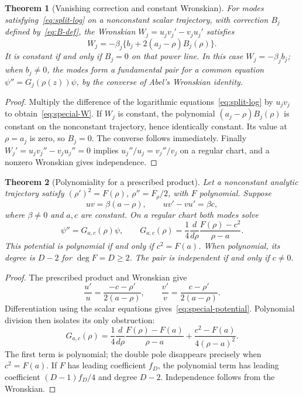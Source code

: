 \documentclass[11pt]{article}
\newtheorem{theorem}{Theorem}[section]
\begin{document}
\begin{theorem}[Vanishing correction and constant Wronskian]
\label{thm:special-W}
For modes satisfying~\eqref{eq:split-log} on a nonconstant scalar trajectory,
with correction $B_j$ defined by~\eqref{eq:B-def}, the Wronskian
$W_j=u_jv_j'-v_ju_j'$ satisfies
\begin{equation}\label{eq:special-W}
 W_j=-\beta_j\{b_j+2(a_j-\rho)B_j(\rho)\}.
\end{equation}
It is constant if and only if $B_j=0$ on that power line.
In this case $W_j=-\beta_jb_j$; when $b_j\ne0$, the modes form a
fundamental pair for a common equation $\psi''=G_j(\rho(z))\psi$,
by the converse of Abel's Wronskian identity.
\end{theorem}

\begin{proof}
Multiply the difference of the logarithmic equations~\eqref{eq:split-log}
by $u_jv_j$ to obtain~\eqref{eq:special-W}.
If $W_j$ is constant, the polynomial $(a_j-\rho)B_j(\rho)$ is constant
on the nonconstant trajectory, hence identically constant. Its value at
$\rho=a_j$ is zero, so $B_j=0$. The converse follows immediately.
Finally $W_j'=u_jv_j''-v_ju_j''=0$ implies
$u_j''/u_j=v_j''/v_j$ on a regular chart, and a nonzero Wronskian gives
independence.
\end{proof}

\begin{theorem}[Polynomiality for a prescribed product]
\label{thm:special-potential}
Let a nonconstant analytic trajectory satisfy $(\rho')^2=F(\rho)$,
$\rho''=F_\rho/2$, with $F$ polynomial. Suppose
\[
 uv=\beta(a-\rho),\qquad uv'-vu'=\beta c,
\]
where $\beta\ne0$ and $a,c$ are constant. On a regular chart both modes
solve
\begin{equation}\label{eq:special-potential}
 \psi''=G_{a,c}(\rho)\psi,\qquad
 G_{a,c}(\rho)=\frac14\frac{d}{d\rho}
                    \frac{F(\rho)-c^2}{\rho-a}.
\end{equation}
This potential is polynomial if and only if $c^2=F(a)$.
When polynomial, its degree is $D-2$ for $\deg F=D\ge2$.
The pair is independent if and only if $c\ne0$.
\end{theorem}

\begin{proof}
The prescribed product and Wronskian give
\[
 \frac{u'}u=\frac{-c-\rho'}{2(a-\rho)},\qquad
 \frac{v'}v=\frac{c-\rho'}{2(a-\rho)}.
\]
Differentiation using the scalar equations gives~\eqref{eq:special-potential}.
Polynomial division then isolates its only obstruction:
\begin{equation}\label{eq:special-pole}
 G_{a,c}(\rho)=\frac14\frac{d}{d\rho}
                 \frac{F(\rho)-F(a)}{\rho-a}
              +\frac{c^2-F(a)}{4(\rho-a)^2}.
\end{equation}
The first term is polynomial; the double pole disappears precisely when
$c^2=F(a)$. If $F$ has leading coefficient $f_D$, the polynomial term
has leading coefficient $(D-1)f_D/4$ and degree $D-2$.
Independence follows from the Wronskian.
\end{proof}
\end{document}
